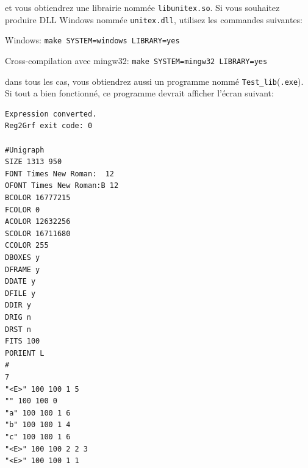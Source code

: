 \bigskip
\noindent et vous obtiendrez une librairie nommée \verb+libunitex.so+. Si vous souhaitez produire 
DLL Windows nommée \verb+unitex.dll+, utilisez les commandes suivantes:

\bigskip
Windows: \verb+make SYSTEM=windows LIBRARY=yes+

Cross-compilation avec mingw32: \verb+make SYSTEM=mingw32 LIBRARY=yes+

\bigskip
\noindent dans tous les cas, vous obtiendrez aussi un programme nommé
\verb+Test_lib+(\verb+.exe+). Si tout a bien fonctionné, ce programme devrait afficher l'écran
suivant:

\begin{verbatim}
Expression converted.
Reg2Grf exit code: 0

#Unigraph
SIZE 1313 950
FONT Times New Roman:  12
OFONT Times New Roman:B 12
BCOLOR 16777215
FCOLOR 0
ACOLOR 12632256
SCOLOR 16711680
CCOLOR 255
DBOXES y
DFRAME y
DDATE y
DFILE y
DDIR y
DRIG n
DRST n
FITS 100
PORIENT L
#
7
"<E>" 100 100 1 5
"" 100 100 0
"a" 100 100 1 6
"b" 100 100 1 4
"c" 100 100 1 6
"<E>" 100 100 2 2 3
"<E>" 100 100 1 1
\end{verbatim}
